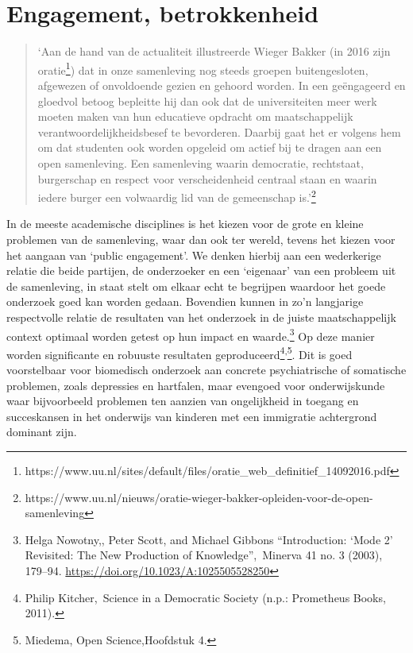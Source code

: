 \documentclass[empirical, authordate, ]{new-jote-article}
\begin{document}
	\section{Engagement, betrokkenheid}

	\begin{quote}
		\itshape

		‘Aan de hand van de actualiteit illustreerde Wieger Bakker (in 2016 zijn oratie\footnote{https://www.uu.nl/sites/default/files/oratie\_web\_definitief\_14092016.pdf}) dat in onze samenleving nog steeds groepen buitengesloten, afgewezen of onvoldoende gezien en gehoord worden. In een geëngageerd en gloedvol betoog bepleitte hij dan ook dat de universiteiten meer werk moeten maken van hun educatieve opdracht om maatschappelijk verantwoordelijkheidsbesef te bevorderen. Daarbij gaat het er volgens hem om dat studenten ook worden opgeleid om actief bij te dragen aan een open samenleving. Een samenleving waarin democratie, rechtstaat, burgerschap en respect voor verscheidenheid centraal staan en waarin iedere burger een volwaardig lid van de gemeenschap is.'\footnote{https://www.uu.nl/nieuws/oratie-wieger-bakker-opleiden-voor-de-open-samenleving}
	\end{quote}

	In de meeste academische disciplines is het kiezen voor de grote en kleine problemen van de samenleving, waar dan ook ter wereld, tevens het kiezen voor het aangaan van ‘public engagement'. We denken hierbij aan een wederkerige relatie die beide partijen, de onderzoeker en een ‘eigenaar' van een probleem uit de samenleving, in staat stelt om elkaar echt te begrijpen waardoor het goede onderzoek goed kan worden gedaan. Bovendien kunnen in zo'n langjarige respectvolle relatie de resultaten van het onderzoek in de juiste maatschappelijk context optimaal worden getest op hun impact en waarde.\footnote{Helga Nowotny,, Peter Scott, and Michael Gibbons “Introduction: ‘Mode 2' Revisited: The New Production of Knowledge”, Minerva 41 no. 3 (2003), 179--94. \href{about:blank}{https://doi.org/10.1023/A:1025505528250}} Op deze manier worden significante en robuuste resultaten geproduceerd\footnote{Philip Kitcher, Science in a Democratic Society (n.p.: Prometheus Books, 2011).}\textsuperscript{,}\footnote{Miedema, Open Science,Hoofdstuk 4.}. Dit is goed voorstelbaar voor biomedisch onderzoek aan concrete psychiatrische of somatische problemen, zoals depressies en hartfalen, maar evengoed voor onderwijskunde waar bijvoorbeeld problemen ten aanzien van ongelijkheid in toegang en succeskansen in het onderwijs van kinderen met een immigratie achtergrond dominant zijn.
\end{document}
